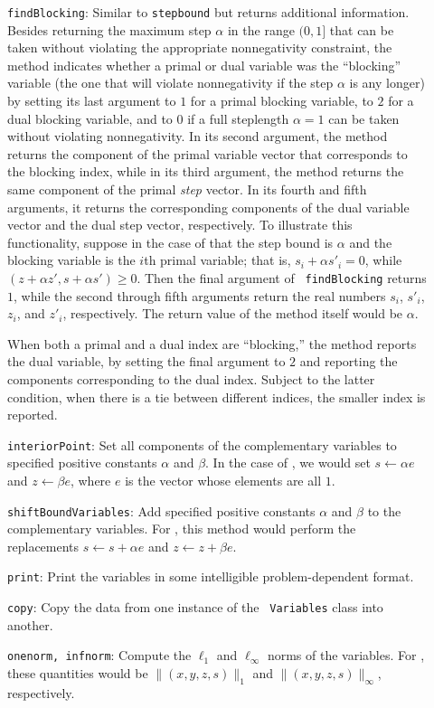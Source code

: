 \begin{description}
\item[] {\tt findBlocking}: Similar to {\tt stepbound} but returns
additional information. Besides returning the maximum step $\alpha$ in
the range $(0,1]$ that can be taken without violating the appropriate
nonnegativity constraint, the method indicates whether a primal or
dual variable was the ``blocking'' variable (the one that will violate
nonnegativity if the step $\alpha$ is any longer) by setting its last
argument to $1$ for a primal blocking variable, to $2$ for a dual
blocking variable, and to $0$ if a full steplength $\alpha = 1$ can be
taken without violating nonnegativity. In its second argument, the
method returns the component of the primal variable vector that
corresponds to the blocking index, while in its third argument, the
method returns the same component of the primal {\em step} vector. In
its fourth and fifth arguments, it returns the corresponding
components of the dual variable vector and the dual step vector,
respectively. To illustrate this functionality, suppose in the case of
 that the step bound is $\alpha$ and the blocking variable
is the $i$th primal variable; that is, $s_i + \alpha s'_i = 0$, while
$(z+ \alpha z', s+\alpha s') \ge 0$. Then the final argument of {\tt
findBlocking} returns $1$, while the second through fifth arguments
return the real numbers $s_i$, $s'_i$, $z_i$, and $z'_i$,
respectively. The return value of the method itself would be $\alpha$.

When both a primal and a dual index are ``blocking,'' the method
reports the dual variable, by setting the final argument to $2$ and
reporting the components corresponding to the dual index. Subject to
the latter condition, when there is a tie between different indices,
the smaller index is reported.
  
\item[] {\tt interiorPoint}: Set all components of the complementary
  variables to specified positive constants $\alpha$ and $\beta$. In
  the case of , we would set $s \leftarrow \alpha e$ and
  $z \leftarrow \beta e$, where $e$ is the vector whose elements are
  all $1$.
  
\item[] {\tt shiftBoundVariables}: Add specified positive constants
  $\alpha$ and $\beta$ to the complementary variables. For ,
  this method would perform the replacements $s \leftarrow s + \alpha
  e$ and $z \leftarrow z + \beta e$.
  
\item[]{\tt print}: Print the variables in some intelligible
  problem-dependent format.
  
\item[] {\tt copy}: Copy the data from one instance of the {\tt
    Variables} class into another.
  
\item[] {\tt onenorm, infnorm}: Compute the $\ell_1$ and
  $\ell_{\infty}$ norms of the variables. For , these
  quantities would be $\| (x,y,z,s) \|_1$ and $\|
  (x,y,z,s) \|_{\infty}$, respectively.

\end{description}


